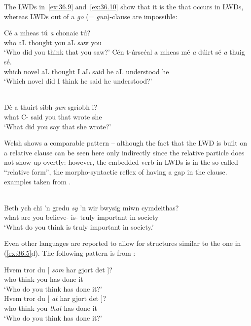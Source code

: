 \documentclass[output=paper]{langsci/langscibook}
\begin{document}
The \glspl{LWD} in~\eqref{ex:36.9} and~\eqref{ex:36.10} show that it is the \Rci{}
that occurs in \glspl{LWD}, whereas \glspl{LWD} out of a \emph{go} (= \emph{gun})-clause are
impossible:

\ea\label{ex:36.9} 
    \ea
        \gll Cé   a  mheas    tú   \textit{a}  chonaic  tú? \\
             who   aL   thought  you   aL  saw   you \\
        \glt ‘Who did you think that you saw?’
    \ex
        \gll Cén  t-úrscéal  a   mheas  mé  \textit{a}   dúirt  sé  \textit{a}   thuig  sé. \\
             which  novel       aL   thought I  aL   said  he  aL understood he \\
        \glt ‘Which novel did I think he said he understood?’
    \z
\z

\ea\label{ex:36.10} \\
        \gll    \llap{*}Dè      a      thuirt sibh     \textit{gun}   sgrìobh i?   \\
        what  C-\Rel{} said you       that   wrote she\\
        \glt    ‘What did you say that she wrote?’
\z

Welsh shows a comparable pattern -- although the fact that the \gls{LWD} is built on
a relative clause can be seen here only indirectly since the relative particle
does not show up overtly: however, the embedded verb in \glspl{LWD} is in the
so-called \enquote{relative form}, the morpho-syntactic reflex of having a gap in the
clause.  examples taken from \citet[555]{Willis2000}.

\ea\label{ex:36.11} \\
    \gll Beth ych chi ’n gredu \textit{sy} ’n wir bwysig miwn cymdeithas?\\
         what are you \Prog{} believe-\Vn{} {is-\Rel} \Pred{} truly important in society\\
    \glt ‘What do you think is truly important in society.’
\z

Even other  languages are reported to allow for structures similar to
the one in (\ref{ex:36.5}d). The following pattern is from 
\parencite{WesVanLoh2012}:

\ea {}
    \ea
        \gll    Hvem tror du [ \textit{som} \underline{\hphantom{2em}} har gjort det ]?\\
        who  think  you {} \Rci{} {} has  done  it \\
        \glt    ‘Who do you think has done it?’ \\
    \ex
        \gll    Hvem  tror  du [ \textit{at} \underline{\hphantom{2em}} har   gjort  det ]?  \\
        who  think  you {} \textit{that} {} has  done  it \\
        \glt    ‘Who do you think has done it?’
    \z
\z
\end{document}
